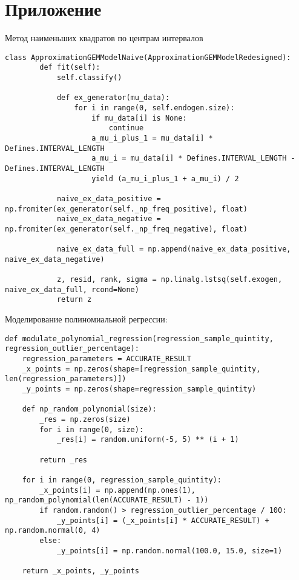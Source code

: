 \section*{Приложение}
{}

Метод наименьших квадратов по центрам интервалов
\begin{Verbatim}[fontsize=\scriptsize]
    class ApproximationGEMModelNaive(ApproximationGEMModelRedesigned):
        def fit(self):
            self.classify()
    
            def ex_generator(mu_data):
                for i in range(0, self.endogen.size):
                    if mu_data[i] is None:
                        continue
                    a_mu_i_plus_1 = mu_data[i] * Defines.INTERVAL_LENGTH
                    a_mu_i = mu_data[i] * Defines.INTERVAL_LENGTH - Defines.INTERVAL_LENGTH
                    yield (a_mu_i_plus_1 + a_mu_i) / 2
    
            naive_ex_data_positive = np.fromiter(ex_generator(self._np_freq_positive), float)
            naive_ex_data_negative = np.fromiter(ex_generator(self._np_freq_negative), float)
    
            naive_ex_data_full = np.append(naive_ex_data_positive, naive_ex_data_negative)
    
            z, resid, rank, sigma = np.linalg.lstsq(self.exogen, naive_ex_data_full, rcond=None)
            return z
\end{Verbatim}

Моделирование полиномиальной регрессии:
\begin{Verbatim}[fontsize=\scriptsize]
def modulate_polynomial_regression(regression_sample_quintity, regression_outlier_percentage):
    regression_parameters = ACCURATE_RESULT
    _x_points = np.zeros(shape=[regression_sample_quintity, len(regression_parameters)])
    _y_points = np.zeros(shape=regression_sample_quintity)

    def np_random_polynomial(size):
        _res = np.zeros(size)
        for i in range(0, size):
            _res[i] = random.uniform(-5, 5) ** (i + 1)

        return _res

    for i in range(0, regression_sample_quintity):
        _x_points[i] = np.append(np.ones(1), np_random_polynomial(len(ACCURATE_RESULT) - 1))
        if random.random() > regression_outlier_percentage / 100:
            _y_points[i] = (_x_points[i] * ACCURATE_RESULT) + np.random.normal(0, 4)
        else:
            _y_points[i] = np.random.normal(100.0, 15.0, size=1)

    return _x_points, _y_points
\end{Verbatim}

